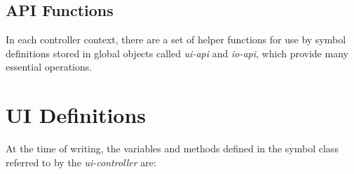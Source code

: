 \documentclass{article}
\def\uicontroller{\textit{ui-controller}\xspace}
\def\uiapi{\textit{ui-api}\xspace}
\def\ioapi{\textit{io-api}\xspace}
\begin{document}
\subsection*{API Functions}\label{sec:api_functions}

In each controller context, there are a set of helper functions for use by symbol definitions stored in global objects called \uiapi and \ioapi, which provide many essential operations.

\section{UI Definitions}\label{sec:ui_callbacks}

At the time of writing, the variables and methods defined in the symbol class referred to by the \uicontroller are:
\end{document}
